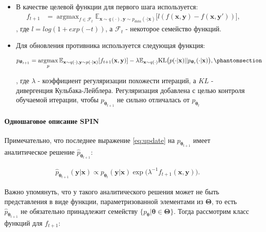\documentclass[12pt, twoside]{article}
\newcommand{\bx}{\mathbf{x}}
\newcommand{\by}{\mathbf{y}}
\newcommand{\btheta}{\boldsymbol{\theta}}
\newcommand{\bTheta}{\boldsymbol{\Theta}}
\newcommand{\cF}{\mathcal{F}}
\newcommand{\EE}{\mathbb{E}}
\newcommand{\argmax}{\mathop{\mathrm{argmax}}}
\begin{document}
\begin{itemize}
    \item В качестве целевой функции для первого шага используется:
    \begin{align}
        f_{t+1} &= \argmax_{f \in \cF_{t}}\EE_{\bx\sim q(\cdot), \by\sim p_{data}(\cdot | \bx)}\big[l(f(\bx, \by) - f(\bx, \by')) \big], \label{eq:f*1}
    \end{align}
    , где $l = log(1 + exp(-t))$, а $\cF_t$ - некоторое семейство функций.

    \vspace{8}

    \item Для обновления противника используется следующая функция:
    
    \begin{align} 
        p_{\btheta_{t+1}} = \argmax_ {p}\EE_{\bx \sim q(\cdot), \by\sim p(\cdot|\bx)} [f_{t+1}(\bx, \by)] - \lambda \EE_{\bx\sim q(\cdot)}\mathrm{KL}\big(p(\cdot|\bx)||p_{\btheta_t}(\cdot|\bx)\big), \phantomsection\label{eq:update}
    \end{align} 
    
    , где $\lambda$ - коэффициент регуляризации похожести итераций, а $KL$ - дивергенция Кульбака-Лейблера. Регуляризация добавлена с целью контроля обучаемой итерации, чтобы $p_\btheta_{t+1}$  не сильно отличалась от $p_\btheta_t$
    
    
\end{itemize}

\paragraph{Одношаговое описание SPIN}

Примечательно, что последнее выражение \eqref{eq:update} на $p_{\btheta_{t+1}}$ имеет аналитическое решение $\hat p_{\btheta_{t+1}}$:

\begin{align}
\hat{p}_{\btheta_{t+1}}(\by|\bx) \propto p_{\btheta_t}(\by|\bx) \exp\big(\lambda^{-1}f_{t+1}(\bx, \by)\big). \label{eq:closed form solution}  
\end{align}

Важно упомянуть, что у такого аналитического решения может не быть представления в виде функции, параметризованной элементами из $\bTheta$, то есть $\hat{p}_{\btheta_{t+1}}$ не обязательно принадлежит семейству $\{p_{\btheta} | \btheta \in \bTheta\}$. Тогда рассмотрим класс функций для $f_{t+1}$:
\end{document}
